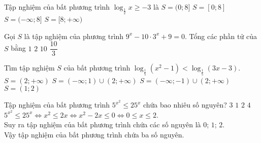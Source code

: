 \begin{ex}%
	Tập nghiệm của bất phương trình $\log_{\tfrac{1}{2}}x\geq-3$ là
	\choice
	{$S=(0;8]$}
	{\True $S=[0;8]$}
	{$S=(-\infty;8]$}
	{$S=[8;+\infty)$}
\end{ex}

%

\begin{ex}%
	Gọi $S$ là tập nghiệm của phương trình $9^x-10\cdot 3^x+9=0$. Tổng các phần tử của $S$ bằng
	\choice
	{$1$}
	{\True $2$}
	{$10$}
	{$\dfrac{10}{3}$}
\end{ex}

%

\begin{ex}%
	Tìm tập nghiệm $S$ của bất phương trình
	$\log_{\tfrac{1}{5}}\left(x^2-1\right) < \log_{\tfrac{1}{5}}(3x-3)$.
	\choice
	{\True $S=(2;+\infty)$}
	{$S=(-\infty; 1) \cup(2;+\infty)$}
	{$S=(-\infty;-1) \cup(2;+\infty)$}
	{$S=(1; 2)$}
\end{ex}

\begin{ex}%
	Tập nghiệm của bất phương trình $5^{x^2}\le 25^x$ chứa bao nhiêu số nguyên?
	\choice
	{\True $3$}
	{$1$}
	{$2$}
	{$4$}
	\loigiai
	{
	$5^{x^2}\le 25^x \Leftrightarrow x^2 \leq 2x \Leftrightarrow x^2-2x\leq 0 \Leftrightarrow 0\leq x \leq 2$.\\
	Suy ra tập nghiệm của bất phương trình chứa các số nguyên là $0$; $1$; $2$.\\
	Vậy tập nghiệm của bất phương trình chứa ba số nguyên.
	}
\end{ex}

